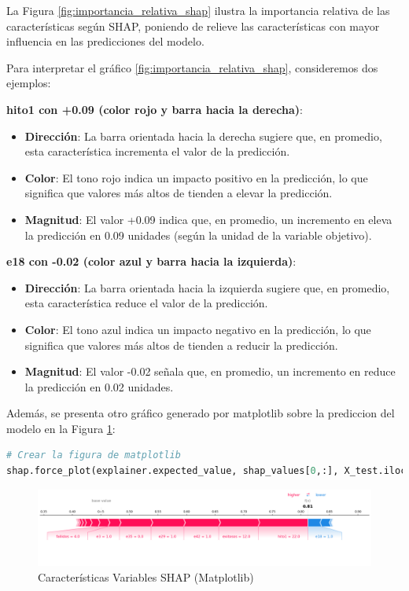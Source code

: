 La Figura \ref{fig:importancia_relativa_shap} ilustra la importancia relativa de las características según SHAP, poniendo de relieve las características con mayor influencia en las predicciones del modelo.

Para interpretar el gráfico \ref{fig:importancia_relativa_shap}, consideremos dos ejemplos:

\textbf{hito1 con +0.09 (color rojo y barra hacia la derecha)}:
\begin{itemize}
    \item \textbf{Dirección}: La barra orientada hacia la derecha sugiere que, en promedio, esta característica incrementa el valor de la predicción.
    \item \textbf{Color}: El tono rojo indica un impacto positivo en la predicción, lo que significa que valores más altos de  tienden a elevar la predicción.
    \item \textbf{Magnitud}: El valor +0.09 indica que, en promedio, un incremento en  eleva la predicción en 0.09 unidades (según la unidad de la variable objetivo).
\end{itemize}


\textbf{e18 con -0.02 (color azul y barra hacia la izquierda)}:
\begin{itemize}
    \item \textbf{Dirección}: La barra orientada hacia la izquierda sugiere que, en promedio, esta característica reduce el valor de la predicción.
    \item \textbf{Color}: El tono azul indica un impacto negativo en la predicción, lo que significa que valores más altos de  tienden a reducir la predicción.
    \item \textbf{Magnitud}: El valor -0.02 señala que, en promedio, un incremento en  reduce la predicción en 0.02 unidades.
\end{itemize}


Además, se presenta otro gráfico generado por matplotlib sobre la prediccion del modelo en la Figura \ref{fig:caract_var_shap_mat}:

\begin{lstlisting}[language=Python, caption=grafico matplotib, label=lst:graf_matplotib]
# Crear la figura de matplotlib
shap.force_plot(explainer.expected_value, shap_values[0,:], X_test.iloc[0,:], matplotlib=True)
\end{lstlisting}

\begin{figure}[H]
    \centering
    \includegraphics[width=1\textwidth]{img/shap_rf/shapForcePlot.png}
    \caption{Características Variables SHAP (Matplotlib)}
    \label{fig:caract_var_shap_mat}
\end{figure}

